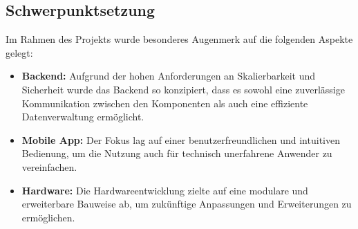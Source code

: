 \subsection{Schwerpunktsetzung}

Im Rahmen des Projekts wurde besonderes Augenmerk auf die folgenden Aspekte gelegt:

\begin{itemize}
  \item \textbf{\textcolor{red7}{Backend:}} Aufgrund der hohen Anforderungen an Skalierbarkeit und Sicherheit wurde das Backend so konzipiert, dass es sowohl eine zuverlässige Kommunikation zwischen den Komponenten als auch eine effiziente Datenverwaltung ermöglicht.
  \item \textbf{\textcolor{red7}{Mobile App:}} Der Fokus lag auf einer benutzerfreundlichen und intuitiven Bedienung, um die Nutzung auch für technisch unerfahrene Anwender zu vereinfachen.
  \item \textbf{\textcolor{red7}{Hardware:}} Die Hardwareentwicklung zielte auf eine modulare und erweiterbare Bauweise ab, um zukünftige Anpassungen und Erweiterungen zu ermöglichen.
\end{itemize}

